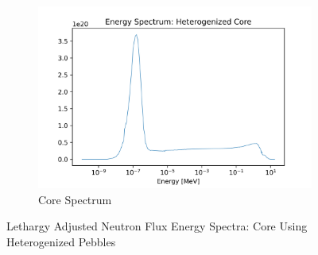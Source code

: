 \begin{figure}[H]
\centering

\begin{subfigure}{0.95\textwidth}
  \includegraphics[width=0.95\linewidth]{figures/core_spec_het}
  \caption{Core Spectrum}
  \label{fig:het-core}
\end{subfigure}%

\caption{Lethargy Adjusted Neutron Flux Energy Spectra: Core Using Heterogenized Pebbles}
\end{figure}

